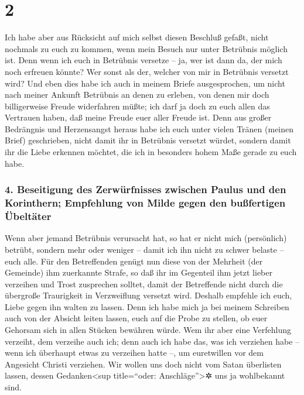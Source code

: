 \hypertarget{section-1}{%
\section{2}\label{section-1}}

 Ich habe aber aus Rücksicht auf mich selbst diesen
Beschluß gefaßt, nicht nochmals zu euch zu kommen, wenn mein Besuch nur
unter Betrübnis möglich ist.  Denn wenn ich euch in
Betrübnis versetze -- ja, wer ist dann da, der mich noch erfreuen
könnte? Wer sonst als der, welcher von mir in Betrübnis versetzt wird?
 Und eben dies habe ich auch in meinem Briefe
ausgesprochen, um nicht nach meiner Ankunft Betrübnis an denen zu
erleben, von denen mir doch billigerweise Freude widerfahren müßte; ich
darf ja doch zu euch allen das Vertrauen haben, daß meine Freude euer
aller Freude ist.  Denn aus großer Bedrängnis und
Herzensangst heraus habe ich euch unter vielen Tränen (meinen Brief)
geschrieben, nicht damit ihr in Betrübnis versetzt würdet, sondern damit
ihr die Liebe erkennen möchtet, die ich in besonders hohem Maße gerade
zu euch habe.

\hypertarget{beseitigung-des-zerwuxfcrfnisses-zwischen-paulus-und-den-korinthern-empfehlung-von-milde-gegen-den-buuxdffertigen-uxfcbeltuxe4ter}{%
\subsubsection{4. Beseitigung des Zerwürfnisses zwischen Paulus und den
Korinthern; Empfehlung von Milde gegen den bußfertigen
Übeltäter}\label{beseitigung-des-zerwuxfcrfnisses-zwischen-paulus-und-den-korinthern-empfehlung-von-milde-gegen-den-buuxdffertigen-uxfcbeltuxe4ter}}

 Wenn aber jemand Betrübnis verursacht hat, so hat er
nicht mich (persönlich) betrübt, sondern mehr oder weniger -- damit ich
ihn nicht zu schwer belaste -- euch alle.  Für den
Betreffenden genügt nun diese von der Mehrheit (der Gemeinde) ihm
zuerkannte Strafe,  so daß ihr im Gegenteil ihm jetzt
lieber verzeihen und Trost zusprechen solltet, damit der Betreffende
nicht durch die übergroße Traurigkeit in Verzweiflung versetzt wird.
 Deshalb empfehle ich euch, Liebe gegen ihn walten zu
lassen.  Denn ich habe mich ja bei meinem Schreiben auch
von der Absicht leiten lassen, euch auf die Probe zu stellen, ob euer
Gehorsam sich in allen Stücken bewähren würde.  Wem ihr
aber eine Verfehlung verzeiht, dem verzeihe auch ich; denn auch ich habe
das, was ich verziehen habe -- wenn ich überhaupt etwas zu verzeihen
hatte --, um euretwillen vor dem Angesicht Christi verziehen.
 Wir wollen uns doch nicht vom Satan überlisten lassen,
dessen Gedanken\textless sup title=``oder: Anschläge''\textgreater✲ uns
ja wohlbekannt sind.

